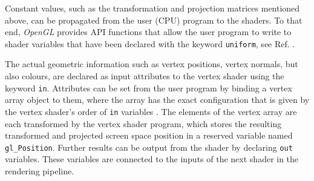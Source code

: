 Constant values, such as the transformation and projection matrices mentioned above, can be propagated from the 
user (CPU) program to the shaders. To that end, \textit{OpenGL} provides API functions that allow the user 
program to write to shader variables that have been declared with the keyword \lstinline[language=C]|uniform|,
see Ref. \cite[pp. 103-126]{Sellers2002}.

The actual geometric information such as vertex positions, vertex normals, but also colours, are declared as
input attributes to the vertex shader using the keyword \lstinline[language=C]|in|.
Attributes can be set from the user program by binding a vertex array object to them,
where the array has the exact configuration that is given by the vertex shader's order of \lstinline[language=C]|in|
variables \cite[pp. 97-102]{Sellers2002}.
The elements of the vertex array are each transformed by the vertex shader program, which stores the resulting 
transformed and projected screen space position in a reserved variable named \lstinline[language=C]|gl_Position|.
Further results can be output from the shader by declaring \lstinline[language=C]|out| variables.
These variables are connected to the inputs of the next shader in the rendering pipeline.
